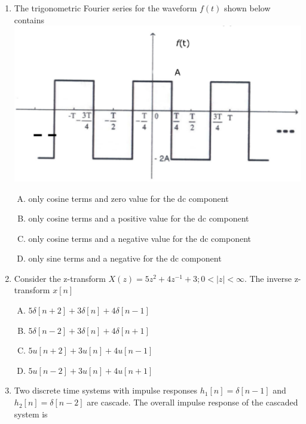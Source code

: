 \documentclass[journal,12pt,twocolumn]{IEEEtran}
\begin{document}
\begin{enumerate}
\begin{enumerate}[(A)]
\end{enumerate}
\item The trigonometric Fourier series for the waveform $f(t)$ shown below contains\\
\includegraphics[scale=0.4]{fig10.eps}

\begin{enumerate}[(A)]

\setlength\itemsep{2em}

\item only cosine terms and zero value for the dc component
\item only cosine terms and a positive value for the dc component
\item only cosine terms and a negative value for the dc component
\item only sine terms and a negative for the dc component

\end{enumerate}

\item Consider the z-transform $X(z)=5z^{2}+4z^{-1}+3;0<|z|<\infty$. The inverse z-transform $x[n]$

\begin{enumerate}[(A)]

\setlength\itemsep{2em}

\item $5\delta[n+2]+3\delta[n]+4\delta[n-1]$
\item $5\delta[n-2]+3\delta[n]+4\delta[n+1]$
\item $5u[n+2]+3u[n]+4u[n-1]$
\item $5u[n-2]+3u[n]+4u[n+1]$

\end{enumerate}

\item Two discrete time systems with impulse responses $h_1[n]=\delta[n-1]$ and $h_2[n]=\delta[n-2]$ are cascade. The overall impulse response of the cascaded system is


\end{enumerate}
\end{document}
